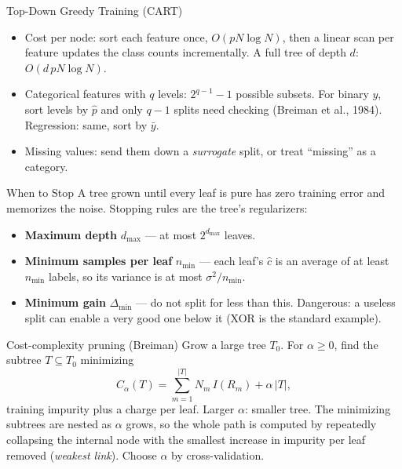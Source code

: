\documentclass[11pt,aspectratio=169]{beamer}
\begin{document}
\begin{frame}{Top-Down Greedy Training (CART)}\small
\begin{algorithm}[H]
\SetAlgoLined
{}
\end{algorithm}
\begin{itemize}
  \item Cost per node: sort each feature once, $O(pN\log N)$, then a linear scan per feature updates the class counts
        incrementally. A full tree of depth $d$: $O(d\,pN\log N)$.
  \item Categorical features with $q$ levels: $2^{q-1}-1$ possible subsets. For binary $y$, sort levels by
        $\hat p$ and only $q-1$ splits need checking (Breiman et al., 1984). Regression: same, sort by $\bar y$.
  \item Missing values: send them down a \emph{surrogate} split, or treat ``missing'' as a category.
\end{itemize}
\end{frame}

\begin{frame}{When to Stop}\footnotesize
A tree grown until every leaf is pure has zero training error and memorizes the noise.
Stopping rules are the tree's regularizers:
\begin{itemize}
  \item \textbf{Maximum depth} $d_{\max}$ --- at most $2^{d_{\max}}$ leaves.
  \item \textbf{Minimum samples per leaf} $n_{\min}$ --- each leaf's $\hat c$ is an average of at least $n_{\min}$ labels,
        so its variance is at most $\sigma^2/n_{\min}$.
  \item \textbf{Minimum gain} $\Delta_{\min}$ --- do not split for less than this. Dangerous: a useless split can enable
        a very good one below it (XOR is the standard example).
\end{itemize}
\vspace{4pt}
\begin{block}{Cost-complexity pruning (Breiman)}
Grow a large tree $T_0$. For $\alpha\ge0$, find the subtree $T\subseteq T_0$ minimizing
\[
C_\alpha(T)=\sum_{m=1}^{|T|}N_m\,I(R_m)+\alpha\,|T| ,
\]
training impurity plus a charge per leaf. Larger $\alpha$: smaller tree. The minimizing subtrees are nested as
$\alpha$ grows, so the whole path is computed by repeatedly collapsing the internal node with the smallest
increase in impurity per leaf removed (\emph{weakest link}). Choose $\alpha$ by cross-validation.
\end{block}
\end{frame}
\end{document}
